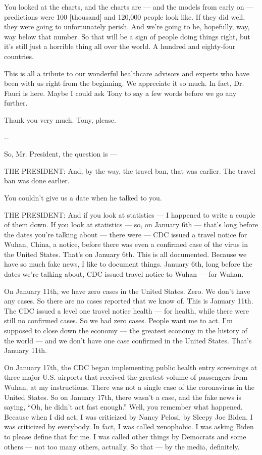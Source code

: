 You looked at the charts, and the charts are --- and the models from
early on --- predictions were 100 {[}thousand{]} and 120,000 people look
like. If they did well, they were going to unfortunately perish. And
we're going to be, hopefully, way, way below that number. So that will
be a sign of people doing things right, but it's still just a horrible
thing all over the world. A hundred and eighty-four countries.

This is all a tribute to our wonderful healthcare advisors and experts
who have been with us right from the beginning. We appreciate it so
much. In fact, Dr. Fauci is here. Maybe I could ask Tony to say a few
words before we go any further.

Thank you very much. Tony, please.

-\/-

So, Mr. President, the question is ---

THE PRESIDENT: And, by the way, the travel ban, that was earlier. The
travel ban was done earlier.

You couldn't give us a date when he talked to you.

THE PRESIDENT: And if you look at statistics --- I happened to write a
couple of them down. If you look at statistics --- so, on January 6th
--- that's long before the dates you're talking about --- there were ---
CDC issued a travel notice for Wuhan, China, a notice, before there was
even a confirmed case of the virus in the United States. That's on
January 6th. This is all documented. Because we have so much fake news,
I like to document things. January 6th, long before the dates we're
talking about, CDC issued travel notice to Wuhan --- for Wuhan.

On January 11th, we have zero cases in the United States. Zero. We don't
have any cases. So there are no cases reported that we know of. This is
January 11th. The CDC issued a level one travel notice health --- for
health, while there were still no confirmed cases. So we had zero cases.
People want me to act. I'm supposed to close down the economy --- the
greatest economy in the history of the world --- and we don't have one
case confirmed in the United States. That's January 11th.

On January 17th, the CDC began implementing public health entry
screenings at three major U.S. airports that received the greatest
volume of passengers from Wuhan, at my instructions. There was not a
single case of the coronavirus in the United States. So on January 17th,
there wasn't a case, and the fake news is saying, ``Oh, he didn't act
fast enough.'' Well, you remember what happened. Because when I did act,
I was criticized by Nancy Pelosi, by Sleepy Joe Biden. I was criticized
by everybody. In fact, I was called xenophobic. I was asking Biden to
please define that for me. I was called other things by Democrats and
some others --- not too many others, actually. So that --- by the media,
definitely.

